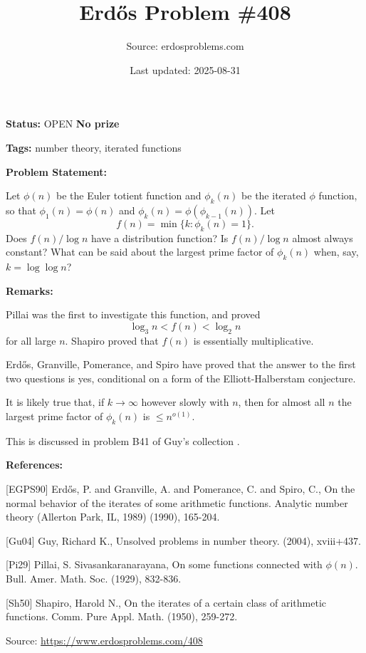 \documentclass{article}
\title{Erd\H{o}s Problem \#408}
\date{Last updated: 2025-08-31}
\author{Source: erdosproblems.com}
\begin{document}
\maketitle

\noindent\textbf{Status:} OPEN \quad \textbf{No prize}

\noindent\textbf{Tags:} number theory, iterated functions

\medskip
\noindent\textbf{Problem Statement:}

Let $\phi(n)$ be the Euler totient function and $\phi_k(n)$ be the iterated $\phi$ function, so that $\phi_1(n)=\phi(n)$ and $\phi_k(n)=\phi(\phi_{k-1}(n))$. Let\[f(n) = \min \{ k : \phi_k(n)=1\}.\]Does $f(n)/\log n$ have a distribution function? Is $f(n)/\log n$ almost always constant? What can be said about the largest prime factor of $\phi_k(n)$ when, say, $k=\log\log n$?

\bigskip
\noindent\textbf{Remarks:}

Pillai \cite{Pi29} was the first to investigate this function, and proved\[\log_3 n < f(n) < \log_2 n\]for all large $n$. Shapiro \cite{Sh50} proved that $f(n)$ is essentially multiplicative.

Erd\H{o}s, Granville, Pomerance, and Spiro \cite{EGPS90} have proved that the answer to the first two questions is yes, conditional on a form of the Elliott-Halberstam conjecture. 

It is likely true that, if $k\to \infty$ however slowly with $n$, then for almost all $n$ the largest prime factor of $\phi_k(n)$ is $\leq n^{o(1)}$.

This is discussed in problem B41 of Guy's collection \cite{Gu04}.

\bigskip
\noindent\textbf{References:}

[EGPS90] Erd\H{o}s, P. and Granville, A. and Pomerance, C. and Spiro, C., On the normal behavior of the iterates of some arithmetic functions. Analytic number theory (Allerton Park, IL, 1989) (1990), 165-204.
 
 [Gu04] Guy, Richard K., Unsolved problems in number theory. (2004), xviii+437.
 
 [Pi29] Pillai, S. Sivasankaranarayana, On some functions connected with {$\phi(n)$}. Bull. Amer. Math. Soc. (1929), 832-836.
 
 [Sh50] Shapiro, Harold N., On the iterates of a certain class of arithmetic functions. Comm. Pure Appl. Math. (1950), 259-272.

\bigskip
\noindent\small{Source: \url{https://www.erdosproblems.com/408}}
\end{document}
